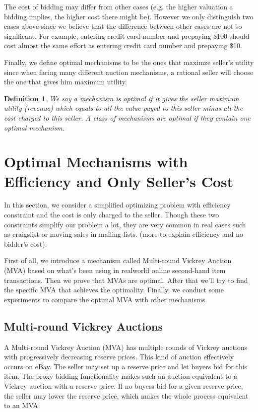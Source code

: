 \documentclass{aamas2012}
\newtheorem{definition}{Definition}
\begin{document}
The cost of bidding may differ from other cases (e.g. the higher valuation a
bidding implies, the higher cost there might be). However we only distinguish
two cases above since we believe that the difference between other cases are
not so significant. For example, entering credit card number and prepaying
\$100 should cost almost the same effort as entering credit card number and
prepaying \$10.

Finally, we define optimal mechanisms to be the ones that maximze seller's
utility since when facing many different auction mechanisms, a rational seller
will choose the one that gives him maximum utility.

\begin{definition}

We say a mechanism is optimal if it gives the seller maximum utility (revenue)
which equals to all the value payed to this seller minus all the cost charged
to this seller. A class of mechanisms are optimal if they contain one optimal
mechanism.

\end{definition}

\section{Optimal Mechanisms with Efficiency and Only Seller's Cost}

In this section, we consider a simplified optimizing problem with efficiency
constraint and the cost is only charged to the seller.  Though these two
constraints simplify our problem a lot, they are very common in real cases such
as craigslist or moving sales in mailing-lists. (more to explain efficiency
and no bidder's cost).

First of all, we introduce a mechanism called Multi-round Vickrey Auction (MVA)
based on what's been using in realworld online second-hand item transactions.
Then we prove that MVAs are optimal. After that we'll try to find the specific
MVA that achieves the optimality. Finally, we conduct some experiments to
compare the optimal MVA with other mechanisms.

\subsection{Multi-round Vickrey Auctions}

A Multi-round Vickrey Auction (MVA) has multiple rounds of Vickrey
auctions with progressively decreasing reserve prices. This kind of auction
effectively occurs on eBay. The seller may set up a reserve price and let
buyers bid for this item. The proxy bidding functionality makes such an auction
equivalent to a Vickrey auction with a reserve price. If no buyers bid for a
given reserve price, the seller may lower the reserve price, which makes the
whole process equivalent to an MVA.
\end{document}
